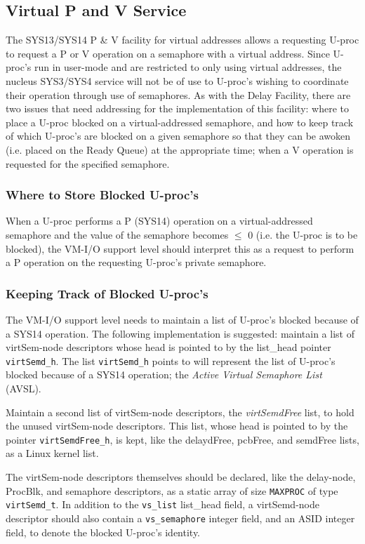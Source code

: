 \subsection{Virtual P and V Service}
The SYS13/SYS14 P \& V facility for virtual addresses allows a requesting U-proc to request a P or V operation on a semaphore with a virtual address.
Since U-proc's run in user-mode and are restricted to only using virtual addresses, the nucleus SYS3/SYS4 service will not be of use to U-proc's wishing to coordinate their operation through use of semaphores.
As with the Delay Facility, there are two issues that need addressing for the implementation of this facility: where to place a U-proc blocked on a virtual-addressed semaphore, and how to keep track of which U-proc's are blocked on a given semaphore so that they can be awoken (i.e. placed on the Ready Queue) at the appropriate time; when a V operation is requested for the specified semaphore.


\subsubsection{Where to Store Blocked U-proc's}
When a U-proc performs a P (SYS14) operation on a virtual-addressed semaphore and the value of the semaphore becomes $\le$ 0 (i.e. the U-proc is to be blocked), the VM-I/O support level should interpret this as a request to perform a P operation on the requesting U-proc's private semaphore.


\subsubsection{Keeping Track of Blocked U-proc's}
The VM-I/O support level needs to maintain a list of U-proc's blocked because of a SYS14 operation. 
The following implementation is suggested: maintain a list of virtSem-node descriptors whose head is pointed to by the list\_head pointer \verb+virtSemd_h+. The list \verb+virtSemd_h+ points to will represent the list of U-proc's blocked because of a SYS14 operation; the \emph{Active Virtual Semaphore List} (AVSL).

Maintain a second list of virtSem-node descriptors, the \emph{virtSemdFree} list, to hold the unused virtSem-node descriptors. 
This list, whose head is pointed to by the pointer \verb+virtSemdFree_h+, is kept, like the delaydFree, pcbFree, and semdFree lists, as a Linux kernel list.

The virtSem-node descriptors themselves should be declared, like the delay-node, ProcBlk, and semaphore descriptors, as a static array of size \verb+MAXPROC+ of type \verb+virtSemd_t+. 
In addition to the \verb+vs_list+ list\_head field, a virtSemd-node descriptor should also contain a \verb+vs_semaphore+ integer field, and an ASID integer field, to denote the blocked U-proc's identity.

